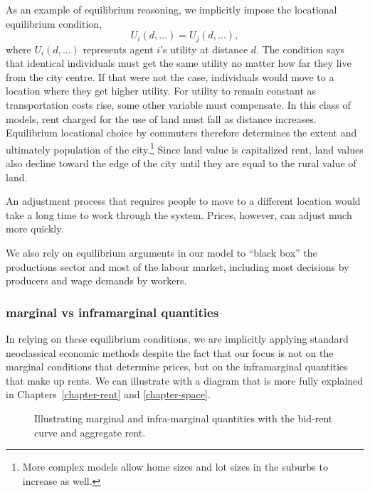 {As an example of \gls{equilibrium reasoning},  we implicitly impose the locational equilibrium condition,
\[U_i(d,\dots)=U_j(d, \dots),\]where $U_i(d,\dots)$ represents agent $i$'s utility at distance $d$. 
The condition says that identical individuals must get the same utility no matter how far they live from the city centre. If that were not the case, individuals would move to a location where they get higher utility. For utility to remain constant as  transportation costs  rise, some other variable must compensate. In this class of models, rent charged for the use of land must fall as distance increases. Equilibrium locational choice by commuters therefore determines the extent and ultimately  population of the city.\footnote{More complex models allow home sizes and lot sizes in the suburbs to increase as well.} Since land value  is \gls{capitalize}d rent, land values also decline toward the edge of the city until they are equal to the rural value of land. 

An adjustment process that requires people to move to a different location would take a long time to work through the system. Prices, however, can adjust much more quickly.




We also rely on equilibrium arguments in our model to ``black box'' the productions sector and most of  the labour market, including most decisions by producers and wage demands by workers. 


\subsubsection{\Gls{marginal} vs \gls{inframarginal} quantities}
In relying on these equilibrium conditions, we are implicitly applying standard neoclassical economic methods despite the fact that our focus is not on the \gls{marginal} conditions that determine prices, but on the \gls{inframarginal} quantities that make up rents. We can illustrate with a diagram that is more fully explained in Chapters~\ref{chapter-rent} and \ref{chapter-space}. 

\begin{figure}[h!t!]
\centering

\caption{Illustrating marginal and infra-marginal quantities with the bid-rent curve and aggregate rent.}
\label{fig-land-rent-as-inframarginal}
\end{figure}


}
